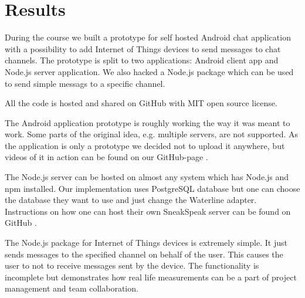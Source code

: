 \section{Results}
During the course we built a prototype for self hosted Android chat application with a possibility to add Internet of Things devices to send messages to chat channels. The prototype is split to two applications: Android client app and Node.js server application. We also hacked a Node.js package which can be used to send simple messags to a specific channel.

All the code is hosted and shared on GitHub \cite{sneakrepo} with MIT open source license.

The Android application prototype is roughly working the way it was meant to work. Some parts of the original idea, e.g. multiple servers, are not supported. As the application is only a prototype we decided not to upload it anywhere, but videos of it in action can be found on our GitHub-page \cite[sp-android]{sneakrepo}.

The Node.js server can be hosted on almost any system which has Node.js and npm installed. Our implementation uses PostgreSQL database but one can choose the database they want to use and just change the Waterline adapter. Instructions on how one can host their own SneakSpeak server can be found on GitHub \cite[sp-server]{sneakrepo}.

The Node.js package for Internet of Things devices is extremely simple. It just sends messages to the specified channel on behalf of the user. This causes the user to not to receive messages sent by the device. The functionality is incomplete but demonstrates how real life measurements can be a part of project management and team collaboration. 